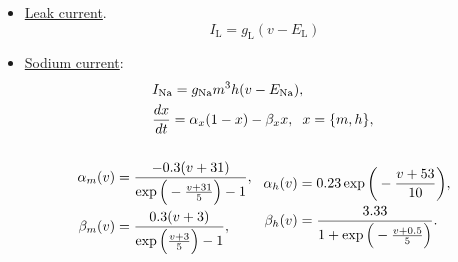 \documentclass[../main.tex]{subfiles}
\begin{document}
\begin{itemize}
    \item \underline{Leak current}.
        \begin{equation}
            I_\text{L} = g_\text{L}(v-E_\text{L})
            \label{eq:cck-leak-current}
        \end{equation}
    \item \underline{Sodium current}: 
        \begin{equation}
        \begin{aligned}
            &\hspace{-2.8cm}I_{\text{Na}} = g_{\text{Na}}m^3h(v-E_{\text{Na}}), \\
    &\hspace{-2.8cm}\displaystyle\frac{dx}{dt} = \alpha_x(1-x)-\beta_xx, \hspace{0.2cm} x =\{m,h\},\\
            & \\
        \begin{aligned}
            \alpha_m(v) &= \displaystyle\frac{-0.3(v+31)}{\exp{\Big(-\frac{v+31}{5}\Big)-1}},\hspace{3mm}\\%
            \beta_m(v) &= \displaystyle\frac{0.3(v+3)}{\exp\Big( \frac{v+3}{5}\Big)-1},\\ 
        \end{aligned}
        &
        \begin{aligned}
            \alpha_h(v) &= 0.23\exp{\bigg(-\displaystyle\frac{v+53}{10} \bigg)},\\ %
            \beta_h(v) &= \displaystyle\frac{3.33}{1+\exp{\Big(-\frac{v+0.5}{5}\Big)}}.
        \end{aligned}
        \end{aligned}
        \label{eq:cck-sodium-current}
        \end{equation}
        

\end{itemize}
\end{document}
